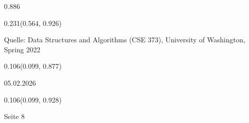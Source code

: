 \documentclass[aspectratio=169]{beamer}
\begin{document}
\begin{frame}[fragile]
\begin{textblock}{0.886}
\end{textblock}
\begin{textblock}{0.231}(0.564, 0.926)
  \begin{minipage}[b][0.032\paperheight]{\linewidth}
    \raggedright
    Quelle: Data Structures and Algorithms (CSE 373), University of Washington, Spring 2022
  \end{minipage}
\end{textblock}
\begin{textblock}{0.106}(0.099, 0.877)
  \begin{minipage}[b][0.026\paperheight]{\linewidth}
    \raggedright
    05.02.2026
  \end{minipage}
\end{textblock}
\begin{textblock}{0.106}(0.099, 0.928)
  \begin{minipage}[b][0.031\paperheight]{\linewidth}
    \raggedright
    Seite 8
  \end{minipage}
\end{textblock}
\end{frame}
\end{document}
